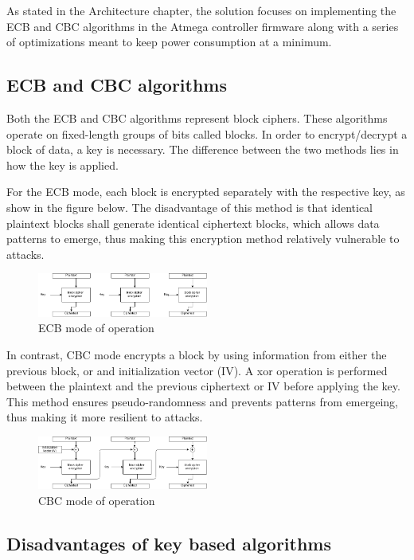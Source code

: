 As stated in the Architecture chapter, the solution focuses on implementing 
the ECB and CBC algorithms in the Atmega controller firmware along with a series 
of optimizations meant to keep power consumption at a minimum.

\subsection{ECB and CBC algorithms}

Both the ECB and CBC algorithms represent block ciphers. These algorithms operate 
on fixed-length groups of bits called blocks. In order to encrypt/decrypt a block 
of data, a key is necessary. The difference between the two methods lies in how 
the key is applied.

For the ECB mode, each block is encrypted separately with the respective key, as 
show in the figure below. The disadvantage of this method is that identical plaintext 
blocks shall generate identical ciphertext blocks, which allows data patterns to 
emerge, thus making this encryption method relatively vulnerable to attacks.

\begin{figure}[ht] \centering
  \includegraphics[width=0.5\textwidth]{img/ECB-function-mode.png}
  \caption{ECB mode of operation}
\end{figure}

In contrast, CBC mode encrypts a block by using information from either the previous 
block, or and initialization vector (IV). A xor operation is performed between the 
plaintext and the previous ciphertext or IV before applying the key. This method 
ensures pseudo-randomness and prevents patterns from emergeing, thus making it 
more resilient to attacks.

\begin{figure}[ht] \centering
  \includegraphics[width=0.5\textwidth]{img/CBC-function-mode.png}
  \caption{CBC mode of operation}
\end{figure}

\subsection{Disadvantages of key based algorithms}

